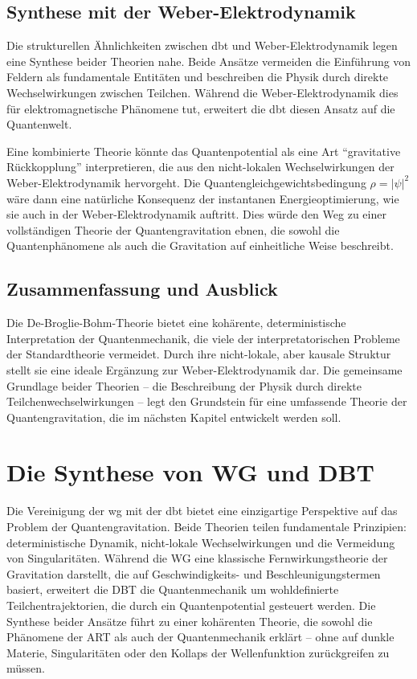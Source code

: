 \subsection{Synthese mit der Weber-Elektrodynamik}
Die strukturellen Ähnlichkeiten zwischen \gls{dbt} und Weber-Elektrodynamik legen eine Synthese beider Theorien nahe. Beide Ansätze vermeiden die Einführung von Feldern als fundamentale
Entitäten und beschreiben die Physik durch direkte Wechselwirkungen zwischen Teilchen. Während die Weber-Elektrodynamik dies für elektromagnetische Phänomene tut, erweitert die
\gls{dbt} diesen Ansatz auf die Quantenwelt.

Eine kombinierte Theorie könnte das Quantenpotential als eine Art \enquote{gravitative Rückkopplung} interpretieren, die aus den nicht-lokalen Wechselwirkungen der Weber-Elektrodynamik hervorgeht.
Die Quantengleichgewichtsbedingung $\rho = \lvert \psi \rvert^{2}$ wäre dann eine natürliche Konsequenz der instantanen Energieoptimierung, wie sie auch in der Weber-Elektrodynamik auftritt.
Dies würde den Weg zu einer vollständigen Theorie der Quantengravitation ebnen, die sowohl die Quantenphänomene als auch die Gravitation auf einheitliche Weise beschreibt.

\subsection{Zusammenfassung und Ausblick}
Die De-Broglie-Bohm-Theorie bietet eine kohärente, deterministische Interpretation der Quantenmechanik, die viele der interpretatorischen Probleme der Standardtheorie vermeidet.
Durch ihre nicht-lokale, aber kausale Struktur stellt sie eine ideale Ergänzung zur Weber-Elektrodynamik dar. Die gemeinsame Grundlage beider Theorien – die Beschreibung der Physik
durch direkte Teilchenwechselwirkungen – legt den Grundstein für eine umfassende Theorie der Quantengravitation, die im nächsten Kapitel entwickelt werden soll.

\section{Die Synthese von WG und DBT}
Die Vereinigung der \gls{wg} mit der \gls{dbt} bietet eine einzigartige Perspektive auf das Problem der Quantengravitation. Beide Theorien teilen fundamentale Prinzipien:
deterministische Dynamik, nicht-lokale Wechselwirkungen und die Vermeidung von Singularitäten. Während die WG eine klassische Fernwirkungstheorie der Gravitation darstellt,
die auf Geschwindigkeits- und Beschleunigungstermen basiert, erweitert die DBT die Quantenmechanik um wohldefinierte Teilchentrajektorien, die durch ein Quantenpotential gesteuert
werden. Die Synthese beider Ansätze führt zu einer kohärenten Theorie, die sowohl die Phänomene der ART als auch der Quantenmechanik erklärt – ohne auf dunkle Materie, Singularitäten
oder den Kollaps der Wellenfunktion zurückgreifen zu müssen.

